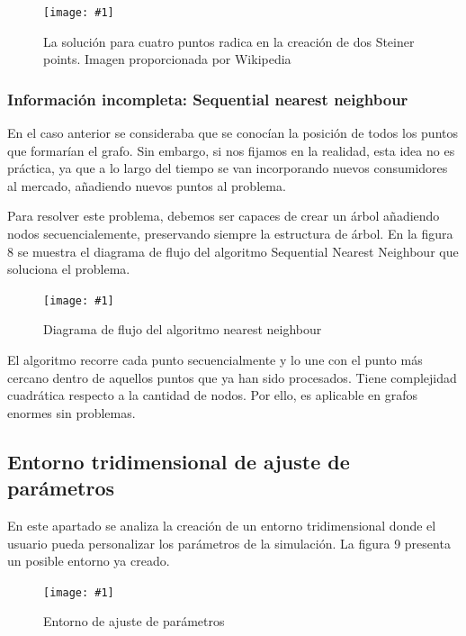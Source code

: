 \documentclass[12pt,a4paper,openright,oneside]{article}
\newcommand{\includeImage}[3]
{
	\begin{figure}[H]
	\begin{center}
	\texttt{[image: \#1]}
	\end{center}
	\caption{#3}
	\end{figure}
}
\numberwithin{equation}{section}
\theoremstyle{definition}
\begin{document}
\includeImage{steiner.png}{4}{La solución para cuatro puntos radica en la creación de dos Steiner points. Imagen proporcionada por Wikipedia}

\subsubsection{Información incompleta: Sequential nearest neighbour}
En el caso anterior se consideraba que se conocían la posición de todos los puntos que formarían el grafo. Sin embargo, si nos fijamos en la realidad, esta idea no es práctica, ya que a lo largo del tiempo se van incorporando nuevos consumidores al mercado, añadiendo nuevos puntos al problema.

Para resolver este problema, debemos ser capaces de crear un árbol añadiendo nodos secuencialemente, preservando siempre la estructura de árbol. En la figura 8 se muestra el diagrama de flujo del algoritmo Sequential Nearest Neighbour que soluciona el problema.




\includeImage{flow_build_tree.png}{6}{ Diagrama de flujo del algoritmo nearest neighbour}

El algoritmo recorre cada punto secuencialmente y lo une con el punto más cercano dentro de aquellos puntos que ya han sido procesados. Tiene complejidad cuadrática respecto a la cantidad de nodos. Por ello, es aplicable en grafos enormes sin problemas.


\subsection{Entorno tridimensional de ajuste de parámetros}
En este apartado se analiza la creación de un entorno tridimensional donde el usuario pueda personalizar los parámetros de la simulación. La figura 9 presenta un posible entorno ya creado.

\includeImage{entorno.png}{10}{Entorno de ajuste de parámetros}
\end{document}
